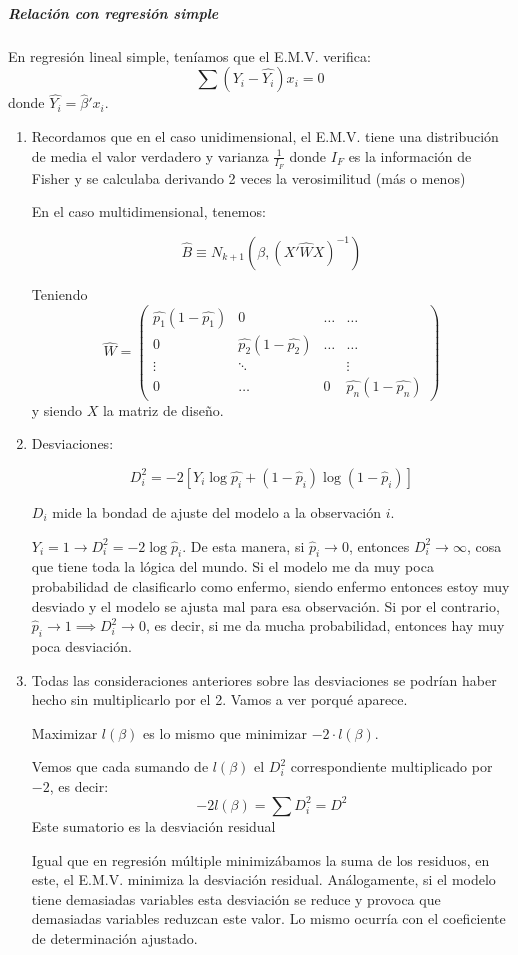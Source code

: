 \subparagraph{Relación con regresión simple}

En regresión lineal simple, teníamos que el E.M.V. verifica: \[ \sum (Y_i - \hat{Y_i}) x_i = 0\] donde $\hat{Y_i} = \hat{β}'x_i$. 


\obs

\begin{enumerate}
  \item Recordamos que en el caso unidimensional, el E.M.V. tiene una distribución de media el valor verdadero y varianza $\frac{1}{I_F}$ donde $I_F$ es la información de Fisher y se calculaba derivando 2 veces la verosimilitud (más o menos)

  En el caso multidimensional, tenemos:

  \[
  \hat{B} \equiv N_{k+1}\left( β,(X'\hat{W}X)^{-1}\right)
  \]

  Teniendo \[\hat{W} = \begin{pmatrix}\hat{p_1}(1-\hat{p_1}) & 0 & \dots & \dots \\ 0 & \hat{p_2}(1-\hat{p_2}) & \dots & \dots \\ \vdots &\ddots & & \vdots \\ 0 & \dots & 0 & \hat{p_n}(1-\hat{p_n})
   \end{pmatrix}\]
  y siendo $X$ la matriz de diseño.
  \item Desviaciones:

    \[D_i^2 = -2\left[ Y_i\log \hat{p_i} + (1-\hat{p}_i)\log(1-\hat{p}_i)\right] \]

  $D_i$ mide la bondad de ajuste del modelo a la observación $i$. 

  \subitem $Y_i = 1 \to D_i^2 = -2\log \hat{p}_i$. De esta manera, si $\hat{p}_i \to 0$, entonces $D_i^2 \to ∞$, cosa que tiene toda la lógica del mundo. Si el modelo me da muy poca probabilidad de clasificarlo como enfermo, siendo enfermo entonces estoy muy desviado y el modelo se ajusta mal para esa observación. Si por el contrario, $\hat{p}_i \to 1 \implies D_i^2 \to 0$, es decir, si me da mucha probabilidad, entonces hay muy poca desviación.

  \item Todas las consideraciones anteriores sobre las desviaciones se podrían haber hecho sin multiplicarlo por el 2. Vamos a ver porqué aparece.

  Maximizar $l(β)$ es lo mismo que minimizar $-2·l(β)$. 

  \begin{defn}
    Vemos que cada sumando de $l(β)$ el $D_i^2$ correspondiente multiplicado por $-2$, es decir:
    \[
      -2 l(β) = \sum D_i^2 = D^2
    \]
    Este sumatorio es la desviación residual
  \end{defn}
  \obs Igual que en regresión múltiple minimizábamos la suma de los residuos, en este, el E.M.V. minimiza la desviación residual. Análogamente, si el modelo tiene demasiadas variables esta desviación se reduce y provoca que demasiadas variables reduzcan este valor. Lo mismo ocurría con el coeficiente de determinación ajustado.


\end{enumerate}
